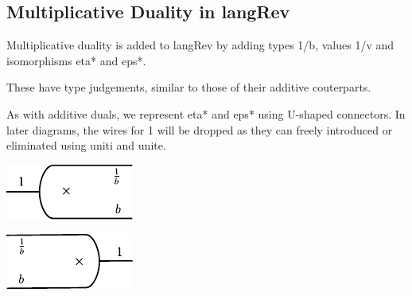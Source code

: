 \documentclass[preprint]{sigplanconf}
\begin{document}
\subsection{Multiplicative Duality in {{langRev}} }
\label{sec:frac}


Multiplicative duality is added to {{langRev}} by adding types
{{1/b}}, values {{1/v}} and isomorphisms {{eta*}} and {{eps*}}.

%

These have type judgements, similar to those of their additive
couterparts.
\begin{multicols}{2}

\end{multicols}

As with additive duals, we represent {{eta*}} and {{eps*}} using
U-shaped connectors. In later diagrams, the wires for {{1}} will be
dropped as they can freely introduced or eliminated using {{uniti}}
and {{unite}}.

\begin{multicols}{2}
\begin{center}
  \includegraphics{diagrams/eta_times.pdf}
\end{center}
  
\begin{center}
  \includegraphics{diagrams/eps_times.pdf}
\end{center}
\end{multicols}
\end{document}
